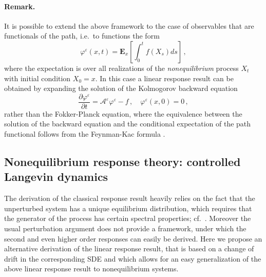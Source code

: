\documentclass[]{tMPH2e}
\newcommand{\eps}{\varepsilon}
\newcommand{\cA}{\mathcal A}
\newcommand{\bE}{{\mathbf E}}
\begin{document}
\paragraph*{Remark.}
It is possible to extend the above framework to the case of observables that are functionals of the path, i.e.~to functions the form 
\[
\varphi^{\eps}(x,t) = \bE_{x}\left[\int_{0}^{t}f(X_{s})ds\right]\,,
\]
where the expectation is over all realizations of the \emph{nonequilibrium} process $X_{t}$ with initial condition $X_{0}=x$. In this case a linear response result can be obtained by expanding the solution of the Kolmogorov backward equation
\[
\frac{\partial\varphi^{\eps}}{\partial t} = \cA^{\eps}\varphi^{\eps} - f\,,\quad \varphi^{\eps}(x,0) = 0\,, 
\]
rather than the Fokker-Planck equation, where the equivalence between the solution of the backward equation and the conditional expectation of the path functional follows from the Feynman-Kac formula \cite[Thm.~1.3.17]{pham2009}. 






\subsection{Nonequilibrium response theory: controlled Langevin dynamics}

The derivation of the classical response result heavily relies on the fact that the unperturbed system has a unique equilibrium distribution, which requires that the generator of the process has certain spectral properties; cf.~\cite{hairer2008,stoltz2012}. Moreover the usual perturbation argument does not provide a framework, under which the second and even higher order responses can easily be derived. Here we propose an alternative derivation of the linear response result, that is based on a change of drift in the corresponding SDE and which allows for an easy generalization of the above linear response result to nonequilibrium systems.
\end{document}
